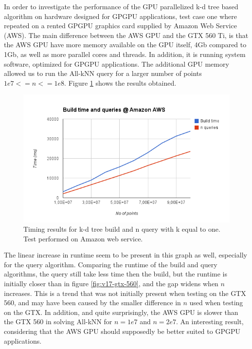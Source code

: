 In order to investigate the performance of the GPU parallelized k-d tree based algorithm on hardware designed for GPGPU applications, test case one where repeated on a rented GPGPU graphics card supplied by Amazon Web Service (AWS). The main difference between the AWS GPU and the GTX 560 Ti, is that the AWS GPU have more memory available on the GPU itself, 4Gb compared to 1Gb, as well as more parallel cores and threads. In addition, it is running system software, optimized for GPGPU applications. The additional GPU memory allowed us to run the All-kNN query for a larger number of points $1e7<=n<=1e8$. Figure \ref{fig:v17-aws} shows the results obtained.

\begin{figure}[ht!]
    \centering
    \includegraphics[width=120mm]{../gfx/v17-aws.png}
    \caption{Timing results for k-d tree build and n query with k equal to one. Test performed on Amazon web service.}
    \label{fig:v17-aws}
\end{figure}

The linear increase in runtime seem to be present in this graph as well, especially for the query algorithm. Comparing the runtime of the build and query algorithms, the query still take less time then the build, but the runtime is initially closer than in figure \ref{fig:v17-gtx-560}, and the gap widens when $n$ increases. This is a trend that was not initially present when testing on the GTX 560, and may have been caused by the smaller difference in $n$ used when testing on the GTX. In addition, and quite surprisingly, the AWS GPU is slower than the GTX 560 in solving All-kNN for $n=1e7$ and $n=2e7$. An interesting result, considering that the AWS GPU should supposedly be better suited to GPGPU applications.

